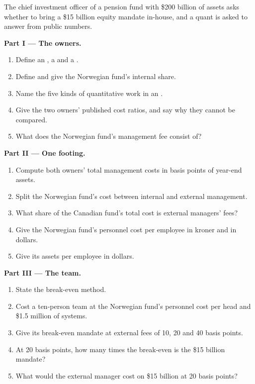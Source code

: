 \begin{problem}\label{pb:in:asset-managers-pensions-sovereign-funds-and-insurers:1}
The chief investment officer of a pension fund with \$200 billion of assets asks whether to bring a \$15 billion
equity mandate in-house, and a quant is asked to answer from public numbers.

\medskip\noindent\textbf{Part I --- The owners.}
\begin{enumerate}
\item Define an , a  and a .
\item Define  and give the Norwegian fund's internal share.
\item Name the five kinds of quantitative work in an .
\item Give the two owners' published cost ratios, and say why they cannot be compared.
\item What does the Norwegian fund's management fee consist of?
\end{enumerate}

\medskip\noindent\textbf{Part II --- One footing.}
\begin{enumerate}[resume]
\item Compute both owners' total management costs in basis points of year-end assets.
\item Split the Norwegian fund's cost between internal and external management.
\item What share of the Canadian fund's total cost is external managers' fees?
\item Give the Norwegian fund's personnel cost per employee in kroner and in dollars.
\item Give its assets per employee in dollars.
\end{enumerate}

\medskip\noindent\textbf{Part III --- The team.}
\begin{enumerate}[resume]
\item State the break-even method.
\item Cost a ten-person team at the Norwegian fund's personnel cost per head and \$1.5 million of systems.
\item Give its break-even mandate at external fees of 10, 20 and 40 basis points.
\item At 20 basis points, how many times the break-even is the \$15 billion mandate?
\item What would the external manager cost on \$15 billion at 20 basis points?
\end{enumerate}


\end{problem}
